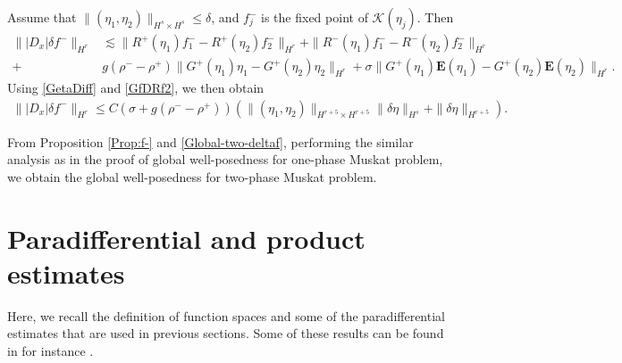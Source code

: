 \documentclass[12pt]{amsart}
\theoremstyle{definition}
\numberwithin{equation}{section}
\begin{document}
Assume that $\|(\eta_1,\eta_2)\|_{H^s\times H^s}\leq\delta$, and $f^-_j$ is the fixed point of $\mathcal{K}(\eta_j)$. Then
\begin{align*}
\||D_x|\delta f^-\|_{H^{r}}&\lesssim
\|R^+(\eta_1)f^-_1-R^+(\eta_2)f^-_2\|_{H^r}+\|R^-(\eta_1)f^-_1-R^-(\eta_2)f^-_2\|_{H^r}\\
+&g(\rho^--\rho^+)\|G^+(\eta_1)\eta_1-G^+(\eta_2)\eta_2\|_{H^r}+\sigma\|G^+(\eta_1)\mathbf{E}(\eta_1)-G^+(\eta_2)\mathbf{E}(\eta_2)\|_{H^r}.
\end{align*}
Using \eqref{GetaDiff} and \eqref{GfDRf2}, we then obtain
\begin{equation}\label{Global-two-deltaf}
\begin{aligned}
\||D_x|\delta f^-\|_{H^{r}}\leq C(\sigma+g(\rho^--\rho^+))\left(\|(\eta_1, \eta_2)\|_{H^{r+5}\times H^{r+5}}\|\delta\eta\|_{H^s}+\|\delta\eta\|_{H^{r+5}}\right).
\end{aligned}   
\end{equation}

From Proposition \ref{Prop:f-} and \eqref{Global-two-deltaf}, performing the similar analysis as in the proof of global well-posedness for one-phase Muskat problem, we obtain the global well-posedness for two-phase Muskat problem.

\appendix
\section{Paradifferential and product estimates} \label{s:Paradifferential}
Here, we recall the definition of function spaces and some of the paradifferential estimates that are used in  previous sections.
Some of these results can be found in for instance \cite{MR2418072, MR2768550, MR3260858}.
\end{document}
